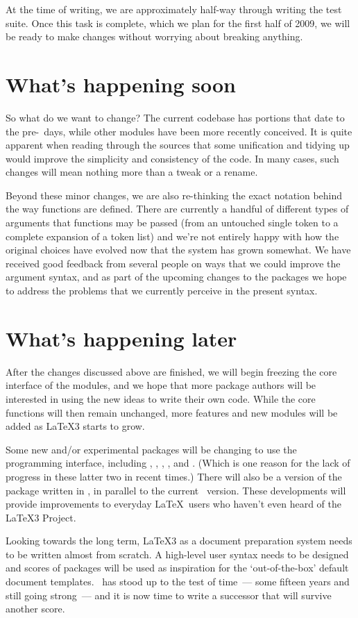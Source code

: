 \documentclass{ltnews}
\begin{document}
At the time of writing, we are approximately half-way through writing the test
suite. Once this task is complete, which we plan for the first
half of 2009, we will be ready to make changes without worrying about breaking
anything.

\section{What's happening soon}

So what do we want to change? The current  codebase has
portions that date to the pre-\LaTeXe\ days, while other modules have been
more recently conceived. It is quite apparent when reading through the sources
that some unification and tidying up would improve the simplicity and
consistency of the code. In many cases, such changes will mean nothing more
than a tweak or a rename.

Beyond these minor changes, we are also re-thinking the exact notation behind
the way functions are defined. There are currently a handful of different
types of arguments that functions may be passed (from an untouched single
token to a complete expansion of a token list) and we're not entirely happy
with how the original choices have evolved now that the system has grown
somewhat. We have received good feedback from several people on ways that we
could improve the argument syntax, and as part of the upcoming changes to the
 packages we hope to address the problems that we currently
perceive in the present syntax.

\section{What's happening later}

After the changes discussed above are finished, we will begin freezing the core
interface of the  modules, and we hope that more package
authors will be interested in using the new ideas to write their own code.
While the core functions will then remain unchanged, more features and new
modules will be added as \LaTeX3 starts to grow.

Some new and/or experimental packages will be changing to use the
 programming interface, including ,
, , , and
. (Which is one reason for the lack of progress in
these latter two in recent times.) There will also be a version of the
 package written in , in parallel to the
current \LaTeXe\ version. These developments will provide improvements to
everyday \LaTeX\ users who haven't even heard of the \LaTeX3 Project.

Looking towards the long term, \LaTeX3 as a document preparation system needs
to be written almost from scratch. A high-level user syntax needs to be
designed and scores of packages will be used as inspiration for the
`out-of-the-box' default document templates. \LaTeXe\ has stood up to the test
of time~--- some fifteen years and still going strong~--- and it is now time
to write a successor that will survive another score.
\end{document}
